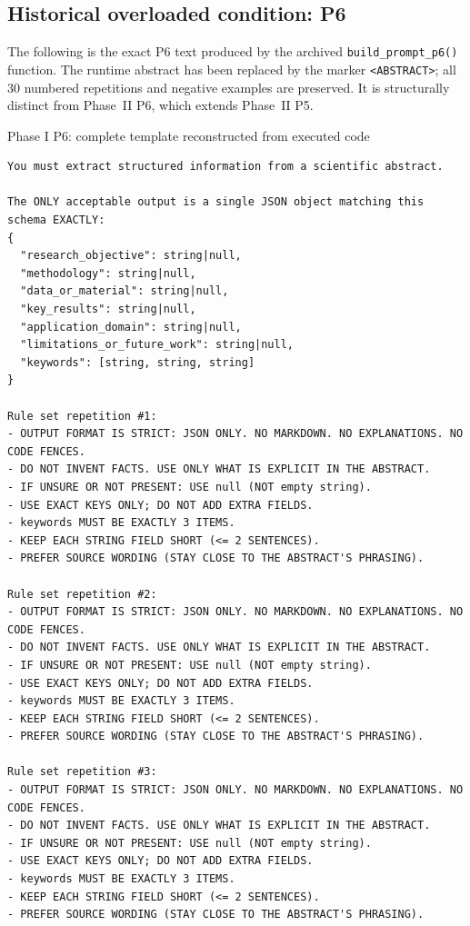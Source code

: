 \documentclass[fleqn,10pt]{wlscirep-authoryear}
\begin{document}
\subsection{Historical overloaded condition: P6}
\label{app:phase1-prompts-p6}
The following is the exact P6 text produced by the archived
\texttt{build\_prompt\_p6()} function. The runtime abstract has been
replaced by the marker \texttt{<ABSTRACT>}; all 30 numbered repetitions
and negative examples are preserved. It is structurally distinct from
Phase~II P6, which extends Phase~II P5.
\begin{promptbox}{Phase I P6: complete template reconstructed from executed code}
\begin{lstlisting}[style=promptstyle]
You must extract structured information from a scientific abstract.

The ONLY acceptable output is a single JSON object matching this schema EXACTLY:
{
  "research_objective": string|null,
  "methodology": string|null,
  "data_or_material": string|null,
  "key_results": string|null,
  "application_domain": string|null,
  "limitations_or_future_work": string|null,
  "keywords": [string, string, string]
}

Rule set repetition #1:
- OUTPUT FORMAT IS STRICT: JSON ONLY. NO MARKDOWN. NO EXPLANATIONS. NO CODE FENCES.
- DO NOT INVENT FACTS. USE ONLY WHAT IS EXPLICIT IN THE ABSTRACT.
- IF UNSURE OR NOT PRESENT: USE null (NOT empty string).
- USE EXACT KEYS ONLY; DO NOT ADD EXTRA FIELDS.
- keywords MUST BE EXACTLY 3 ITEMS.
- KEEP EACH STRING FIELD SHORT (<= 2 SENTENCES).
- PREFER SOURCE WORDING (STAY CLOSE TO THE ABSTRACT'S PHRASING).

Rule set repetition #2:
- OUTPUT FORMAT IS STRICT: JSON ONLY. NO MARKDOWN. NO EXPLANATIONS. NO CODE FENCES.
- DO NOT INVENT FACTS. USE ONLY WHAT IS EXPLICIT IN THE ABSTRACT.
- IF UNSURE OR NOT PRESENT: USE null (NOT empty string).
- USE EXACT KEYS ONLY; DO NOT ADD EXTRA FIELDS.
- keywords MUST BE EXACTLY 3 ITEMS.
- KEEP EACH STRING FIELD SHORT (<= 2 SENTENCES).
- PREFER SOURCE WORDING (STAY CLOSE TO THE ABSTRACT'S PHRASING).

Rule set repetition #3:
- OUTPUT FORMAT IS STRICT: JSON ONLY. NO MARKDOWN. NO EXPLANATIONS. NO CODE FENCES.
- DO NOT INVENT FACTS. USE ONLY WHAT IS EXPLICIT IN THE ABSTRACT.
- IF UNSURE OR NOT PRESENT: USE null (NOT empty string).
- USE EXACT KEYS ONLY; DO NOT ADD EXTRA FIELDS.
- keywords MUST BE EXACTLY 3 ITEMS.
- KEEP EACH STRING FIELD SHORT (<= 2 SENTENCES).
- PREFER SOURCE WORDING (STAY CLOSE TO THE ABSTRACT'S PHRASING).


\end{lstlisting}
\end{promptbox}
\end{document}
